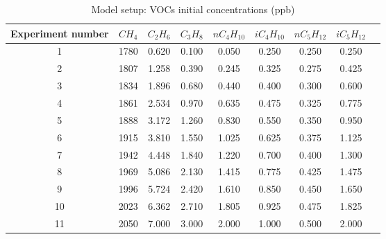 \documentclass[11pt,a4paper]{article}
\begin{document}
\begin{table} %
\caption{Model setup: VOCs initial concentrations (ppb)}
\centering
\begin{tabular}{ccccccccc}
\hline
Experiment number & $CH_4$ & $C_2H_6$ & $C_3H_8$ & $nC_4H_{10}$ & $iC_4H_{10}$ & $nC_5H_{12}$ & $iC_5H_{12}$ \\
\hline
1  & 1780 &	0.620 &	0.100 &	0.050 &	0.250 &	0.250 &	0.250 \\
2  & 1807 &	1.258 &	0.390 &	0.245 &	0.325 &	0.275 &	0.425 \\
3  & 1834 &	1.896 &	0.680 &	0.440 &	0.400 &	0.300 &	0.600 \\
4  & 1861 &	2.534 &	0.970 &	0.635 &	0.475 &	0.325 &	0.775 \\
5  & 1888 &	3.172 &	1.260 &	0.830 &	0.550 &	0.350 &	0.950 \\
6  & 1915 &	3.810 &	1.550 &	1.025 &	0.625 &	0.375 &	1.125 \\
7  & 1942 &	4.448 &	1.840 &	1.220 &	0.700 &	0.400 &	1.300 \\
8  & 1969 &	5.086 &	2.130 &	1.415 &	0.775 &	0.425 &	1.475 \\
9  & 1996 &	5.724 &	2.420 &	1.610 &	0.850 &	0.450 &	1.650 \\
10 & 2023 &	6.362 &	2.710 &	1.805 &	0.925 &	0.475 &	1.825 \\
11 & 2050 &	7.000 &	3.000 &	2.000 &	1.000 &	0.500 &	2.000 \\
\hline
\end{tabular}
\end{table}
\end{document}
